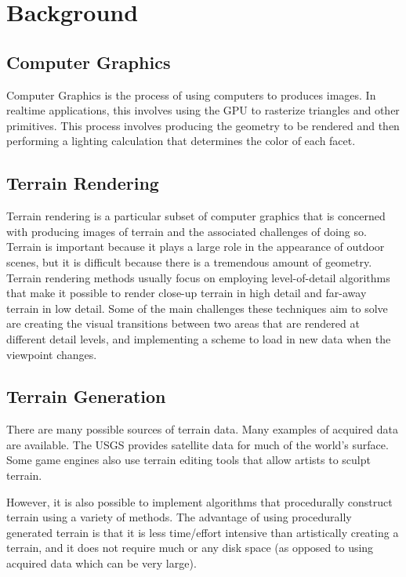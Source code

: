 
\chapter{Background}

\section{Computer Graphics}

Computer Graphics is the process of using computers to produces images.
In realtime applications, this involves using the GPU to rasterize triangles and other primitives.
This process involves producing the geometry to be rendered and then performing a lighting calculation that determines the color of each facet.

\section{Terrain Rendering}

Terrain rendering is a particular subset of computer graphics that is concerned with producing images of terrain and the associated challenges of doing so.
Terrain is important because it plays a large role in the appearance of outdoor scenes, but it is difficult because there is a tremendous amount of geometry.
Terrain rendering methods usually focus on employing level-of-detail algorithms that make it possible to render close-up terrain in high detail and far-away terrain in low detail.
Some of the main challenges these techniques aim to solve are creating the visual transitions between two areas that are rendered at different detail levels, and implementing a scheme to load in new data when the viewpoint changes.

\section{Terrain Generation}

There are many possible sources of terrain data.
Many examples of acquired data are available.
The USGS provides satellite data for much of the world's surface.
Some game engines also use terrain editing tools that allow artists to sculpt terrain.

However, it is also possible to implement algorithms that procedurally construct terrain using a variety of methods.
The advantage of using procedurally generated terrain is that it is less time/effort intensive than artistically creating a terrain, and it does not require much or any disk space (as opposed to using acquired data which can be very large).

